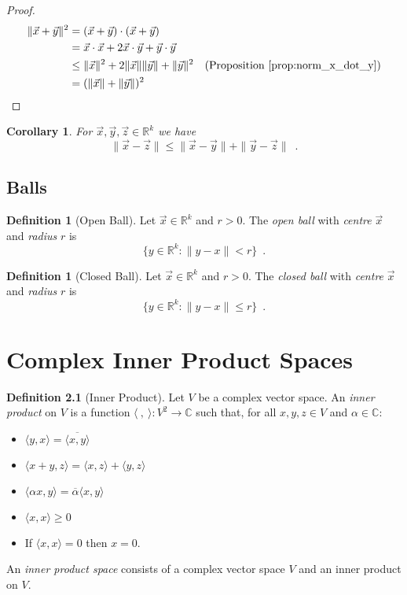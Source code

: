 \documentclass{book}
\let\qed\relax
\newtheorem{cor}{Corollary}[prop]
\theoremstyle{definition}
\newtheorem{df}[prop]{Definition}
\begin{document}
\begin{proof}
\pf
\begin{align*}
\| \vec{x} + \vec{y} \|^2 & = (\vec{x} + \vec{y}) \cdot (\vec{x} + \vec{y}) \\
& = \vec{x} \cdot \vec{x} + 2 \vec{x} \cdot \vec{y} + \vec{y} \cdot \vec{y} \\
& \leq \| \vec{x} \|^2 + 2 \| \vec{x} \| \| \vec{y} \| + \| \vec{y} \|^2 & (\text{Proposition \ref{prop:norm_x_dot_y}}) \\
& = (\| \vec{x} \| + \| \vec{y} \|)^2 & \qed
\end{align*}
\end{proof}

\begin{cor}
\label{cor:triangle_inequality}
For $\vec{x}, \vec{y}, \vec{z} \in \mathbb{R}^k$ we have
\[ \| \vec{x} - \vec{z} \| \leq \| \vec{x} - \vec{y} \| + \| \vec{y} - \vec{z} \| \enspace . \]
\end{cor}

\section{Balls}

\begin{df}[Open Ball]
Let $\vec{x} \in \mathbb{R}^k$ and $r > 0$. The \emph{open ball} with \emph{centre} $\vec{x}$ and \emph{radius} $r$ is
\[ \{ y \in \mathbb{R}^k : \| y - x \| < r \} \enspace . \]
\end{df}

\begin{df}[Closed Ball]
Let $\vec{x} \in \mathbb{R}^k$ and $r > 0$. The \emph{closed ball} with \emph{centre} $\vec{x}$ and \emph{radius} $r$ is
\[ \{ y \in \mathbb{R}^k : \| y - x \| \leq r \} \enspace . \]
\end{df}

\chapter{Complex Inner Product Spaces}

\newcommand{\ket}[1]{\ensuremath{\left| {#1} \right\rangle}}
\newcommand{\bra}[1]{\ensuremath{\left\langle {#1} \right|}}

\begin{df}[Inner Product]
Let $V$ be a complex vector space. An \emph{inner product} on $V$ is a function $\langle \ , \ \rangle :  V^2 \rightarrow \mathbb{C}$ such that, for all $x,y,z \in V$ and $\alpha \in \mathbb{C}$:
\begin{itemize}
\item $\langle y,x \rangle = \overline{\langle x,y \rangle}$
\item $\langle x+y,z \rangle = \langle x,z \rangle + \langle y,z \rangle$
\item $\langle \alpha x,y \rangle = \overline{\alpha} \langle x,y \rangle$
\item $\langle x,x \rangle \geq 0$
\item If $\langle x,x \rangle = 0$ then $x = 0$.
\end{itemize}
An \emph{inner product space} consists of a complex vector space $V$ and an inner product on $V$.
\end{df}
\end{document}
